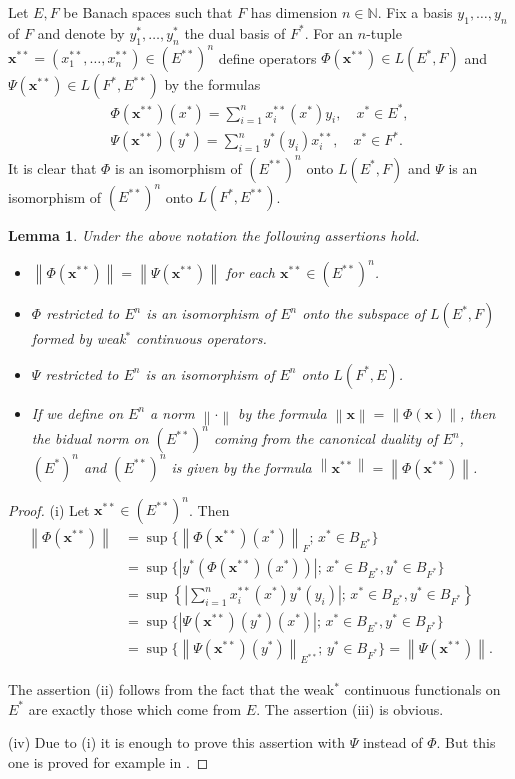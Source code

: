 \documentclass{amsart}
\numberwithin{equation}{section}
\newtheorem{lemma}[thm]{Lemma}
\theoremstyle{definition}
\def\en{\mathbb N}
\newcommand{\norm}[1]{\left\|#1\right\|}
\newcommand{\abs}[1]{\left| #1  \right|}
\newcommand{\setsep}{;\,}
\begin{document}
Let $E,F$ be Banach spaces such that $F$ has dimension $n\in\en$. Fix a basis $y_1,\dots,y_n$ of $F$ and denote by $y_1^*,\dots,y_n^*$ the dual basis of $F^*$. For an $n$-tuple $\boldsymbol x^{**}=(x^{**}_1,\dots,x^{**}_n)\in (E^{**})^n$ define operators $\Phi(\boldsymbol x^{**})\in L(E^*,F)$ and $\Psi(\boldsymbol x^{**})\in L(F^*,E^{**})$ by the formulas
$$\begin{gathered}
\Phi(\boldsymbol x^{**})(x^*)=\sum_{i=1}^n x^{**}_i(x^*)y_i,\quad x^*\in E^*,\\
\Psi(\boldsymbol x^{**})(y^*)=\sum_{i=1}^n y^*(y_i)x^{**}_i,\quad x^*\in F^*.
\end{gathered}$$
It is clear that $\Phi$ is an isomorphism of $(E^{**})^n$ onto $L(E^*,F)$ and $\Psi$ is an isomorphism of  $(E^{**})^n$ onto $L(F^*,E^{**})$.

\begin{lemma}\label{L:locref} Under the above notation the following assertions hold.
\begin{itemize}
	\item[(i)] $\norm{\Phi(\boldsymbol x^{**})}=\norm{\Psi(\boldsymbol x^{**})}$ for each $\boldsymbol x^{**}\in (E^{**})^n$.
	\item[(ii)] $\Phi$ restricted to $E^n$ is an isomorphism of $E^n$ onto the subspace of $L(E^*,F)$ formed by weak$^*$ continuous operators.
	\item[(iii)] $\Psi$ restricted to $E^n$ is an isomorphism of $E^n$ onto $L(F^*,E)$.
	\item[(iv)] If we define on $E^n$ a norm $\norm{\cdot}$ by the formula $\norm{\boldsymbol x}=\norm{\Phi(\boldsymbol x)}$, then the bidual norm on $(E^{**})^n$ coming from the canonical duality of $E^n$, $(E^*)^n$ and $(E^{**})^n$ is given by the formula
	$\norm{\boldsymbol x^{**}}=\norm{\Phi(\boldsymbol x^{**})}$.
\end{itemize}
\end{lemma}

\begin{proof} (i) Let $\boldsymbol x^{**}\in(E^{**})^n$. Then
$$\begin{aligned}
\norm{\Phi(\boldsymbol x^{**})}
&=\sup\{ \norm{\Phi(\boldsymbol x^{**})(x^*)}_F \setsep x^*\in B_{E^*} \}
\\&=\sup\{ \abs{y^*(\Phi(\boldsymbol x^{**})(x^*))} \setsep x^*\in B_{E^*},y^*\in B_{F^*} \}
\\&=\sup\left\{ \abs{\sum_{i=1}^n x^{**}_i(x^*)y^*(y_i)} \setsep x^*\in B_{E^*},y^*\in B_{F^*} \right\}
\\&=\sup\{ \abs{\Psi(\boldsymbol x^{**})(y^*)(x^*)} \setsep x^*\in B_{E^*},y^*\in B_{F^*} \}
\\&=\sup\{ \norm{\Psi(\boldsymbol x^{**})(y^*)}_{E^{**}} \setsep y^*\in B_{F^*} \}
=\norm{\Psi(\boldsymbol x^{**})}.
\end{aligned}$$

The assertion (ii) follows from the fact that the weak$^*$ continuous functionals on $E^*$ are exactly those which come from $E$. The assertion (iii) is obvious.

(iv) Due to (i) it is enough to prove this assertion with $\Psi$ instead of $\Phi$. But this one is proved for example
in \cite[Section 3]{dean}.
\end{proof}
\end{document}
